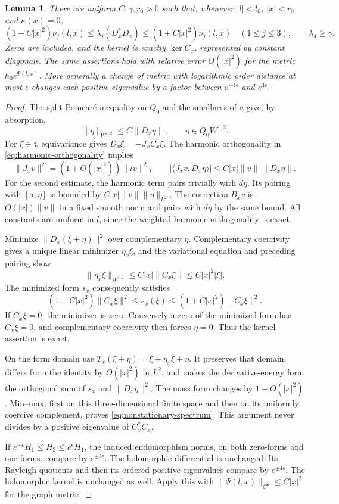 \documentclass[11pt]{amsart}
\newtheorem{lemma}[theorem]{Lemma}
\theoremstyle{definition}
\theoremstyle{remark}
\begin{document}
\begin{lemma}\label{lem:full-spectrum}
There are uniform $C,\gamma,r_0>0$ such that, whenever
$|l|<l_0$, $|x|<r_0$ and $\kappa(x)=0$,
\begin{equation}\label{eq:nonstationary-spectrum}
 (1-C|x|^2)\nu_j(l,x)\le
 \lambda_j(D_x^*D_x)\le(1+C|x|^2)\nu_j(l,x)
       \quad(1\le j\le3),\qquad \lambda_4\ge\gamma .
\end{equation}
Zeros are included, and the kernel is exactly $\ker C_x$,
represented by constant diagonals. The same assertions hold with
relative error $O(|x|^2)$ for the metric $h_0e^{\Psi(l,x)}$.
More generally a change of metric with logarithmic order distance
at most $\epsilon$ changes each positive eigenvalue by a factor
between $e^{-4\epsilon}$ and $e^{4\epsilon}$.
\end{lemma}
\begin{proof}
The split Poincar\'e inequality on $Q_0$ and the smallness of $a$
give, by absorption,
\[
 \|\eta\|_{W^{1,2}}\le C\|D_x\eta\|,\qquad \eta\in Q_0W^{1,2}.
\]
For $\xi\in\mathfrak t$, equivariance gives $D_x\xi=-J_xC_x\xi$.
The harmonic orthogonality in \eqref{eq:harmonic-orthogonality}
implies
\[
 \|J_xv\|^2=(1+O(|x|^2))\|\iota v\|^2,\qquad
 |\langle J_xv,D_x\eta\rangle|
       \le C|x|\|v\|\,\|D_x\eta\|.
\]
For the second estimate, the harmonic term pairs trivially with
$d\eta$. Its pairing with $[a,\eta]$ is bounded by
$C|x|\|v\|\|\eta\|_{L^2}$. The correction $B_xv$ is $O(|x|)\|v\|$
in a fixed smooth norm and pairs with $d\eta$ by the same bound.
All constants are uniform in $l$, since the weighted harmonic
orthogonality is exact.

Minimize $\|D_x(\xi+\eta)\|^2$ over complementary $\eta$.
Complementary coercivity gives a unique linear minimizer $\eta_x\xi$,
and the variational equation and preceding pairing show
\[
 \|\eta_x\xi\|_{W^{1,2}}\le C|x|\|C_x\xi\|
                \le C|x|^2|\xi|.
\]
The minimized form $s_x$ consequently satisfies
\[
 (1-C|x|^2)\|C_x\xi\|^2\le s_x(\xi)
                  \le(1+C|x|^2)\|C_x\xi\|^2.
\]
If $C_x\xi=0$, the minimizer is zero. Conversely a zero of the
minimized form has $C_x\xi=0$, and complementary coercivity then
forces $\eta=0$. Thus the kernel assertion is exact.

On the form domain use
$T_x(\xi+\eta)=\xi+\eta_x\xi+\eta$.
It preserves that domain, differs from the identity by $O(|x|^2)$
in $L^2$, and makes the derivative-energy form the orthogonal sum
of $s_x$ and $\|D_x\eta\|^2$. The mass form changes by
$1+O(|x|^2)$. Min--max, first on this three-dimensional finite
space and then on its uniformly coercive complement, proves
\eqref{eq:nonstationary-spectrum}. This argument never divides
by a positive eigenvalue of $C_x^*C_x$.

If $e^{-\epsilon}H_1\le H_2\le e^\epsilon H_1$, the induced
endomorphism norms, on both zero-forms and one-forms, compare by
$e^{\pm2\epsilon}$. The holomorphic differential is unchanged.
Its Rayleigh quotients and then its ordered positive eigenvalues
compare by $e^{\pm4\epsilon}$. The holomorphic kernel is unchanged
as well. Apply this with
$\|\Psi(l,x)\|_{C^0}\le C|x|^2$ for the graph metric.
\end{proof}
\end{document}
